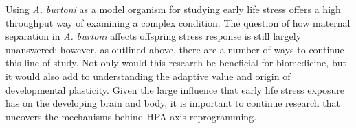\documentclass[12pt,twoside]{reedthesis}
\begin{document}
Using \textit{A. burtoni} as a model organism for studying early life
stress offers a high throughput way of examining a complex condition. The question of how maternal separation in \textit{A.
  burtoni} affects offspring stress response is still largely unanswered;
however, as outlined above, there are a number of ways to continue this line of
study. Not
only would this research be beneficial for biomedicine, but it would also add to
understanding the adaptive value and origin of developmental plasticity. Given the large influence that early life stress exposure has on the developing
brain and body, it is important to continue research that uncovers the
mechanisms behind HPA axis reprogramming.





 
\end{document}
